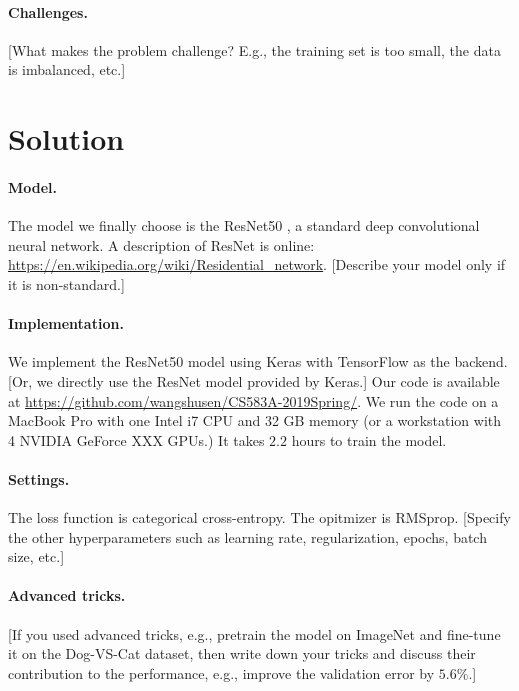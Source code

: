 \documentclass[11pt]{article}
\numberwithin{equation}{section}
\begin{document}
\paragraph{Challenges.}
[What makes the problem challenge? E.g., the training set is too small, the data is imbalanced, etc.]





\section{Solution}

\paragraph{Model.}
The model we finally choose is the ResNet50 \cite{he2016deep}, a standard deep convolutional neural network.
A description of ResNet is online: \url{https://en.wikipedia.org/wiki/Residential_network}.
[Describe your model only if it is non-standard.]


\paragraph{Implementation.}
We implement the ResNet50 model using Keras with TensorFlow as the backend. [Or, we directly use the ResNet model provided by Keras.]
Our code is available at \url{https://github.com/wangshusen/CS583A-2019Spring/}.
We run the code on a MacBook Pro with one Intel i7 CPU and 32 GB memory (or a workstation with 4 NVIDIA GeForce XXX GPUs.)
It takes $2.2$ hours to train the model.


\paragraph{Settings.}
The loss function is categorical cross-entropy.
The opitmizer is RMSprop.
[Specify the other hyperparameters such as learning rate, regularization, epochs, batch size, etc.]


\paragraph{Advanced tricks.}
[If you used advanced tricks, e.g., pretrain the model on ImageNet and fine-tune it on the Dog-VS-Cat dataset, then write down your tricks and discuss their contribution to the performance, e.g., improve the validation error by $5.6\%$.]
\end{document}
